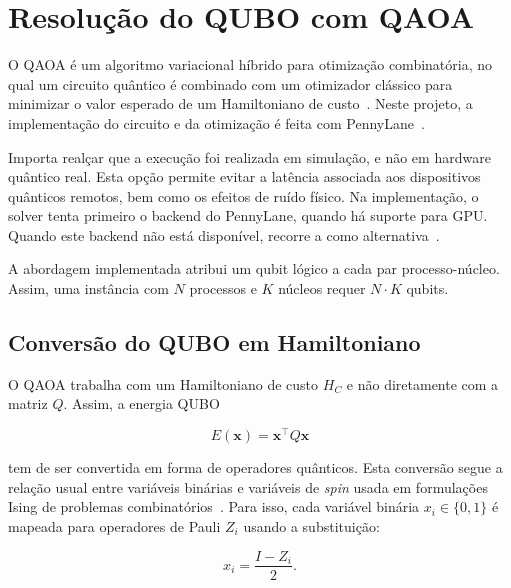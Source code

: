 \chapter{Resolução do QUBO com QAOA}
\label{chap:resolucao-qubo-qaoa}

O \acs{QAOA} é um algoritmo variacional híbrido para otimização combinatória, no qual
um circuito quântico é combinado com um otimizador clássico para
minimizar o valor esperado de um Hamiltoniano de custo~\cite{Farhi2014QAOA,Cerezo2021VQA}.
Neste projeto, a implementação do circuito e da otimização é feita com PennyLane~\cite{Bergholm2018PennyLane}.

Importa realçar que a execução foi realizada em simulação, e não em hardware
quântico real. Esta opção permite evitar a latência associada aos dispositivos
quânticos remotos, bem como os efeitos de ruído físico. Na implementação, o solver
tenta primeiro o backend  do PennyLane, quando há suporte para
\acs{GPU}. Quando este backend não está disponível, recorre a 
como alternativa~\cite{Asadi2024Lightning}.

A abordagem implementada atribui um qubit lógico a cada par processo-núcleo. Assim,
uma instância com $N$ processos e $K$ núcleos requer $N \cdot K$ qubits.

\section{Conversão do QUBO em Hamiltoniano}
\label{sec:conversao-qubo-hamiltoniano}

O \acs{QAOA} trabalha com um Hamiltoniano de custo $H_C$ e não diretamente com a matriz $Q$. Assim, a energia \acs{QUBO}

\begin{equation}
    E(\mathbf{x}) = \mathbf{x}^{\top}Q\mathbf{x}
\end{equation}

tem de ser convertida em forma de operadores quânticos. Esta conversão segue a
relação usual entre variáveis binárias e variáveis de \textit{spin} usada em formulações
Ising de problemas combinatórios~\cite{Lucas2014Ising}. Para isso, cada variável binária $x_i \in \{0,1\}$ é mapeada para operadores de Pauli $Z_i$ usando a substituição:

\begin{equation}
    x_i = \frac{I - Z_i}{2}.
\end{equation}

